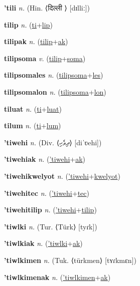 \textbf{\hypertarget{'tili}{'tili}} \textit{n.} (Hin. ⟨{\devanagari{}दिल्ली }⟩ [dɪlliː])


\textbf{\hypertarget{tilip}{tilip}} \textit{n.} (\hyperlink{ti}{ti}+\allowbreak \hyperlink{lip}{lip})


\textbf{\hypertarget{tilipak}{tilipak}} \textit{n.} (\hyperlink{tilip}{tilip}+\allowbreak \hyperlink{ak}{ak})


\textbf{\hypertarget{tilipsoma}{tilipsoma}} \textit{v.} (\hyperlink{tilip}{tilip}+\allowbreak \hyperlink{soma}{soma})


\textbf{\hypertarget{tilipsomales}{tilipsomales}} \textit{n.} (\hyperlink{tilipsoma}{tilipsoma}+\allowbreak \hyperlink{les}{les})


\textbf{\hypertarget{tilipsomalon}{tilipsomalon}} \textit{n.} (\hyperlink{tilipsoma}{tilipsoma}+\allowbreak \hyperlink{lon}{lon})


\textbf{\hypertarget{tiluat}{tiluat}} \textit{n.} (\hyperlink{ti}{ti}+\allowbreak \hyperlink{luat}{luat})


\textbf{\hypertarget{tilum}{tilum}} \textit{n.} (\hyperlink{ti}{ti}+\allowbreak \hyperlink{lum}{lum})


\textbf{\hypertarget{'tiwehi}{'tiwehi}} \textit{n.} (Div. ⟨{\thaana{}ދިވެހި}⟩ [diˈʋehi])


\textbf{\hypertarget{'tiwehiak}{'tiwehiak}} \textit{n.} (\hyperlink{'tiwehi}{'tiwehi}+\allowbreak \hyperlink{ak}{ak})


\textbf{\hypertarget{'tiwehikwelyot}{'tiwehikwelyot}} \textit{n.} (\hyperlink{'tiwehi}{'tiwehi}+\allowbreak \hyperlink{kwelyot}{kwelyot})


\textbf{\hypertarget{'tiwehitec}{'tiwehitec}} \textit{n.} (\hyperlink{'tiwehi}{'tiwehi}+\allowbreak \hyperlink{tec}{tec})


\textbf{\hypertarget{'tiwehitilip}{'tiwehitilip}} \textit{n.} (\hyperlink{'tiwehi}{'tiwehi}+\allowbreak \hyperlink{tilip}{tilip})


\textbf{\hypertarget{'tiwlki}{'tiwlki}} \textit{n.} (Tur. ⟨Türk⟩ [tyɾk])


\textbf{\hypertarget{'tiwlkiak}{'tiwlkiak}} \textit{n.} (\hyperlink{'tiwlki}{'tiwlki}+\allowbreak \hyperlink{ak}{ak})


\textbf{\hypertarget{'tiwlkimen}{'tiwlkimen}} \textit{n.} (Tuk. ⟨türkmen⟩ [tʏɾkmɛn])


\textbf{\hypertarget{'tiwlkimenak}{'tiwlkimenak}} \textit{n.} (\hyperlink{'tiwlkimen}{'tiwlkimen}+\allowbreak \hyperlink{ak}{ak})


